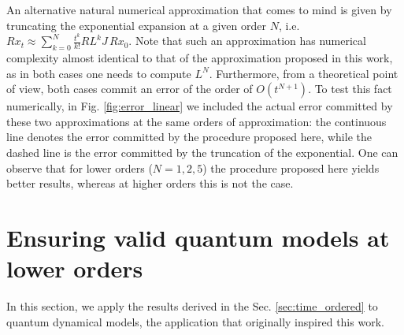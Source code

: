 \documentclass[twocolumn]{autart}    %
\begin{document}
An alternative natural numerical approximation that comes to mind is given by truncating the exponential expansion at a given order $N$, i.e. $Rx_t\approx \sum_{k=0}^{N} \frac{t^k}{k!} RL^k J\, Rx_0$. Note that such an approximation has numerical complexity almost identical to that of the approximation proposed in this work, as in both cases one needs to compute $L^N$. Furthermore, from a theoretical point of view, both cases commit an error of the order of $O(t^{N+1})$. To test this fact numerically, in Fig. \ref{fig:error_linear} we included the actual error committed by these two approximations at the same orders of approximation: the continuous line denotes the error committed by the procedure proposed here, while the dashed line is the error committed by the truncation of the exponential. One can observe that for lower orders ($N=1,2,5$) the procedure proposed here yields better results, whereas at higher orders this is not the case. 

\section{Ensuring valid quantum models at lower orders}
\label{sec:cptp_second_order}

In this section, we apply the results derived in the Sec. \ref{sec:time_ordered} to quantum dynamical models, the application that originally inspired this work. 
\end{document}
